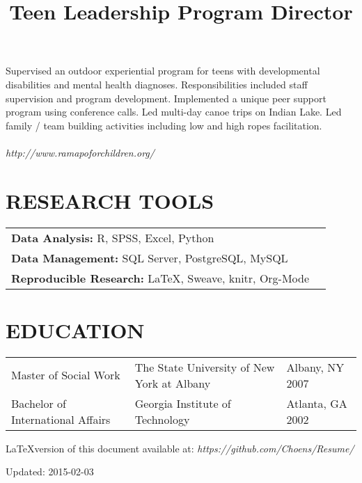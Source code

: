 \documentclass[line, margin, 10pt]{res}
\begin{document}
\begin{resume}
  \title{Teen Leadership Program Director}
  \begin{position}
    Supervised an outdoor experiential program for teens with
    developmental disabilities and mental health
    diagnoses. Responsibilities included staff supervision and program
    development. Implemented a unique peer support program using
    conference calls. Led multi-day canoe trips on Indian Lake. Led family
    / team building activities including low and high ropes
    facilitation. \\ \\
    \emph{http://www.ramapoforchildren.org/}
  \end{position}

  \section{RESEARCH TOOLS}

  \begin{tabular} {l l}
    {\bf Data Analysis:} R, SPSS, Excel, Python\\
    {\bf Data Management:} SQL Server, PostgreSQL, MySQL\\
    {\bf Reproducible Research:} \LaTeX, Sweave, knitr, Org-Mode\\
  \end{tabular}

  \section{EDUCATION}
  \begin{tabular} {p{1.5in} p{2.125in} p{.75in}}
    Master of Social Work & The State University of New  York at Albany & Albany, NY 2007 \\
    Bachelor of International Affairs & Georgia Institute of
    Technology & Atlanta, GA 2002 
  \end{tabular}

  \vspace{.125in} \LaTeX version of this document available at:
  \emph{https://github.com/Choens/Resume/}

  \vspace{.125in} Updated: 2015-02-03

\end{resume}
\end{document}

